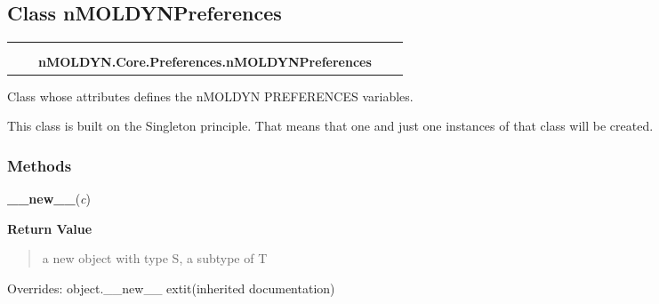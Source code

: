 \subsection{Class nMOLDYNPreferences}

    \label{nMOLDYN:Core:Preferences:nMOLDYNPreferences}
\begin{tabular}{cccccc}
\multicolumn{2}{r}{\settowidth{\BCL}{object}\multirow{2}{\BCL}{object}}
&&
  \\\cline{3-3}
  &&\multicolumn{1}{c|}{}
&&
  \\
&&\multicolumn{2}{l}{\textbf{nMOLDYN.Core.Preferences.nMOLDYNPreferences}}
\end{tabular}

Class whose attributes defines the nMOLDYN PREFERENCES variables.

This class is built on the Singleton principle. That means that one and 
just one instances of that class will be created.



  \subsubsection{Methods}

    \vspace{0.5ex}

\hspace{.8\funcindent}\begin{boxedminipage}{\funcwidth}

    \raggedright \textbf{\_\_new\_\_}(\textit{c})

\setlength{\parskip}{2ex}
\setlength{\parskip}{1ex}
      \textbf{Return Value}
    \vspace{-1ex}

      \begin{quote}
      a new object with type S, a subtype of T

      \end{quote}

      Overrides: object.\_\_new\_\_ 	extit{(inherited documentation)}

    \end{boxedminipage}

    \label{nMOLDYN:Core:Preferences:nMOLDYNPreferences:__getattr__}

